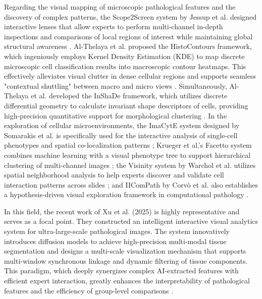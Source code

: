 \documentclass[journal]{vgtc}                     %
\begin{document}
Regarding the visual mapping of microscopic pathological features and the discovery of complex patterns, the Scope2Screen system by Jessup et al. designed interactive lenses that allow experts to perform multi-channel in-depth inspections and comparisons of local regions of interest while maintaining global structural awareness \cite{jessup2021scope2screen}. Al-Thelaya et al. proposed the HistoContours framework, which ingeniously employs Kernel Density Estimation (KDE) to map discrete microscopic cell classification results into macroscopic contour heatmaps. This effectively alleviates visual clutter in dense cellular regions and supports seamless "contextual shuttling" between macro and micro views \cite{al2022histocontours}. Simultaneously, Al-Thelaya et al. developed the InShaDe framework, which utilizes discrete differential geometry to calculate invariant shape descriptors of cells, providing high-precision quantitative support for morphological clustering \cite{al2021inshade}. In the exploration of cellular microenvironments, the ImaCytE system designed by Somarakis et al. is specifically used for the interactive analysis of single-cell phenotypes and spatial co-localization patterns \cite{somarakis2019imacyte}; Krueger et al.'s Facetto system combines machine learning with a visual phenotype tree to support hierarchical clustering of multi-channel images \cite{krueger2019facetto}; the Visinity system by Warchol et al. utilizes spatial neighborhood analysis to help experts discover and validate cell interaction patterns across slides \cite{warchol2022visinity}; and IIComPath by Corvò et al. also establishes a hypothesis-driven visual exploration framework in computational pathology \cite{corvo2020visual}.

In this field, the recent work of Xu et al. (2025) is highly representative and serves as a focal point. They constructed an intelligent interactive visual analytics system for ultra-large-scale pathological images. The system innovatively introduces diffusion models to achieve high-precision multi-modal tissue segmentation and designs a multi-scale visualization mechanism that supports multi-window synchronous linkage and dynamic filtering of tissue components. This paradigm, which deeply synergizes complex AI-extracted features with efficient expert interaction, greatly enhances the interpretability of pathological features and the efficiency of group-level comparisons \cite{xu2025intelligent}.

\end{document}
